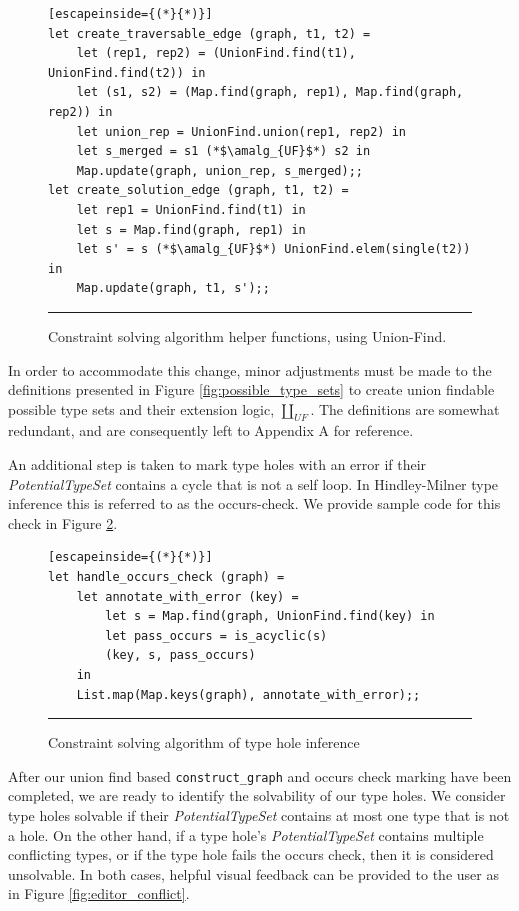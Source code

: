 \begin{figure}[htb!]
\begin{lstlisting}[escapeinside={(*}{*)}]
let create_traversable_edge (graph, t1, t2) =
    let (rep1, rep2) = (UnionFind.find(t1), UnionFind.find(t2)) in
    let (s1, s2) = (Map.find(graph, rep1), Map.find(graph, rep2)) in
    let union_rep = UnionFind.union(rep1, rep2) in
    let s_merged = s1 (*$\amalg_{UF}$*) s2 in
    Map.update(graph, union_rep, s_merged);;
let create_solution_edge (graph, t1, t2) =
    let rep1 = UnionFind.find(t1) in
    let s = Map.find(graph, rep1) in
    let s' = s (*$\amalg_{UF}$*) UnionFind.elem(single(t2)) in
    Map.update(graph, t1, s');;
\end{lstlisting}
\vspace{-2px}
\hrule
\caption{Constraint solving algorithm helper functions, using Union-Find.}
\label{fig:algcode_construct_graph_helpers}
\end{figure}

In order to accommodate this change, minor adjustments must be made to the definitions presented in Figure \ref{fig:possible_type_sets} to create union findable possible type sets and their extension logic, $\amalg_{UF}$. The definitions are somewhat redundant, and are consequently left to Appendix A for reference. 

An additional step is taken to mark type holes with an error if their \emph{PotentialTypeSet} contains a cycle that is not a self loop. In Hindley-Milner type inference this is referred to as the occurs-check. We provide sample code for this check in Figure \ref{fig:occurs_check}.

\begin{figure}[htb!]
\begin{lstlisting}[escapeinside={(*}{*)}]
let handle_occurs_check (graph) =
    let annotate_with_error (key) =
        let s = Map.find(graph, UnionFind.find(key) in
        let pass_occurs = is_acyclic(s)
        (key, s, pass_occurs)
    in
    List.map(Map.keys(graph), annotate_with_error);;
\end{lstlisting}
\vspace{-4px}
 \hrule
\caption{Constraint solving algorithm of type hole inference}
\label{fig:occurs_check}
\end{figure}

After our union find based \lstinline{construct_graph} and occurs check marking have been completed, we are ready to identify the solvability of our type holes. We consider type holes solvable if their \textit{PotentialTypeSet} contains at most one type that is not a hole. On the other hand, if a type hole's \textit{PotentialTypeSet} contains multiple conflicting types, or if the type hole fails the occurs check, then it is considered unsolvable. In both cases, helpful visual feedback can be provided to the user as in Figure \ref{fig:editor_conflict}.

